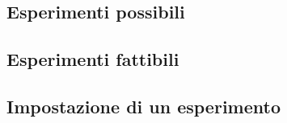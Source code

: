 \subsection{Esperimenti possibili}
\label{ssez:esp_possibili}



\subsection{Esperimenti fattibili}
\label{ssez:esp_fattibili}



\subsection{Impostazione di un esperimento}
\label{ssez:impost_esp}